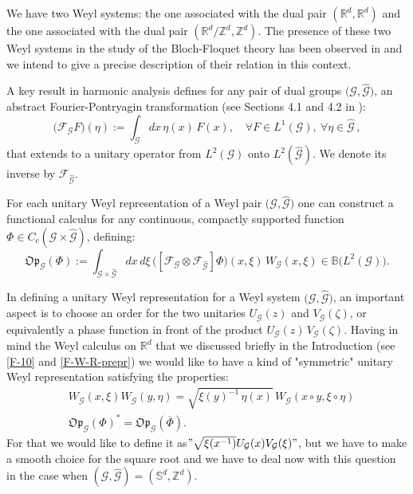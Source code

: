 \documentclass[12pt]{article}
\theoremstyle{definition}
\def\Rd{\mathbb{R}^d}
\def\Zd{\mathbb{Z}^d}
\def\Op{\mathfrak{Op}}
\def\beq{\begin{equation}}
\def\eeq{\end{equation}}
\def\G{\mathcal{G}}
\def\Sd{\mathbb{S}^d}
\numberwithin{equation}{section}
\begin{document}
We have two Weyl systems: the one associated with  the dual pair $(\Rd,\Rd)$ and the one associated with  the dual pair $(\Rd/\Zd,\Zd)$. The presence of these two Weyl systems in the study of the Bloch-Floquet theory has been observed  in \cite{dNL-11} and we intend to give a precise description of their relation in this context.

A key result in harmonic analysis defines for any pair of dual groups $\big(\mathcal{G},\widehat{\mathcal{G}}\big)$, an abstract Fourier-Pontryagin transformation (see Sections 4.1 and 4.2 in \cite{Fo-AHA}):
\beq
\big(\mathcal{F}_{\mathcal{G}}F\big)(\eta):=\int_{\mathcal{G}}dx\,\eta(x)\,F(x),\quad\forall F\in L^1(\mathcal{G}),\ \forall\eta\in\widehat{\mathcal{G}}\,,
\eeq
that extends to a unitary operator from $L^2(\mathcal G)$ onto $L^2(\widehat{\mathcal G})$.  We denote its inverse by $\mathcal{F}_{\widehat{\mathcal{G}}}$.

For each unitary Weyl representation of a Weyl pair $\big(\mathcal{G},\hat{\mathcal{G}}\big)$ one can construct a functional calculus for any continuous, compactly supported function $\Phi\in C_c(\mathcal{G}\times\widehat{\mathcal{G}})$, defining:
\beq
\Op_{\mathcal{G}}(\Phi):=\int_{\mathcal{G}\times\widehat{\mathcal{G}}}dx\,d\xi\,\big([\mathcal{F}_{\mathcal{G}}\otimes\mathcal{F}_{\hat{\mathcal{G}}}]\Phi\big)(x,\xi)\,W_{\mathcal{G}}(x,\xi)\in\mathbb{B}\big(L^2(\mathcal{G})\big).
\eeq

In defining a unitary Weyl representation for a Weyl system $\big(\mathcal{G},\widehat{\mathcal{G}}\big)$, an important aspect is to choose an order for the two unitaries $U_\G(z)$ and $V_\G(\zeta)$, or equivalently a phase function in front of the product $U_\G(z)\,V_\G(\zeta)$. Having in mind the Weyl calculus on $\Rd$ that we discussed briefly in the Introduction (see \eqref{F-10} and \eqref{F-W-R-prepr}) we would like to have a kind of "symmetric" unitary Weyl representation satisfying the properties:
\begin{align}\label{F-B-2}
	&W_{\mathcal{G}}(x,\xi)W_{\mathcal{G}}(y,\eta)=\sqrt{\xi(y)^{-1}\,\eta(x)}\, W_{\mathcal{G}}(x\circ{y},\xi\circ\eta) \\
	&\Op_{\mathcal{G}}(\Phi)^*=\Op_{\mathcal{G}}(\overline{\Phi}).
\end{align}
For that we would like to define it as$
	"\sqrt{\xi(x^{-1})}U_{\mathcal{G}}(x)V_{\mathcal{G}}(\xi)"$,
but we have to make a smooth choice for the square root and we have to deal now with this question in the case when $ (\mathcal G, \widehat {\mathcal G})=(\Sd,\Zd)$. 
\end{document}
